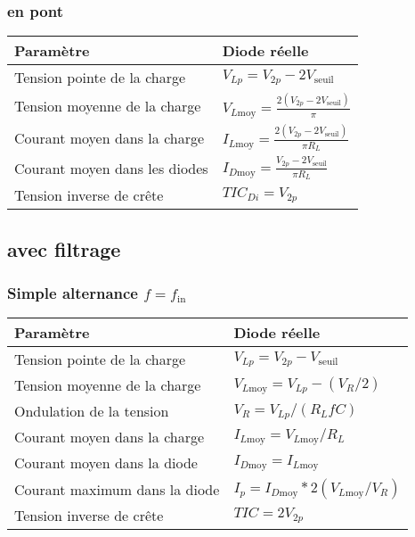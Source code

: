 \subsubsection{en pont}
\begin{tabular}{ll}
    Paramètre & Diode réelle \\\hline
    Tension pointe de la charge & \(V_{Lp}=V_{2p}-2V_{\mathrm{seuil}}\)\\
    Tension moyenne de la charge & \(V_{L\mathrm{moy}}=\frac{2(V_{2p}-2V_{\mathrm{seuil}})}{\pi}\)\\
    Courant moyen dans la charge & \(I_{L\mathrm{moy}}=\frac{2(V_{2p}-2V_{\mathrm{seuil}})}{\pi R_L}\)\\
    Courant moyen dans les diodes &  \(I_{D\mathrm{moy}}=\frac{V_{2p}-2V_{\mathrm{seuil}}}{\pi R_L}\)\\
    Tension inverse de crête & \(TIC_{Di}=V_{2p}\)
\end{tabular}

\subsection{avec filtrage}
\renewcommand{\arraystretch}{1}
\subsubsection{Simple alternance $f=f_{\mathrm{in}}$}
\begin{center}
    
\end{center}
\begin{tabular}{ll}
    Paramètre & Diode réelle \\\hline
    Tension pointe de la charge & \(V_{Lp}=V_{2p}-V_{\mathrm{seuil}}\)\\
    Tension moyenne de la charge & \(V_{L\mathrm{moy}}=V_{Lp}-(V_{R}/2)\)\\
    Ondulation de la tension & \(V_{R}=V_{Lp}/(R_L f C)\)\\
    Courant moyen dans la charge & \(I_{L\mathrm{moy}}=V_{L\mathrm{moy}}/R_{L} \)\\
    Courant moyen dans la diode &  \(I_{D\mathrm{moy}}=I_{L\mathrm{moy}}\)\\
    Courant maximum dans la diode & \(I_p=I_{D\mathrm{moy}}*2(V_{L\mathrm{moy}} / V_R)\)\\
    Tension inverse de crête & \(TIC=2V_{2p}\)
\end{tabular}

